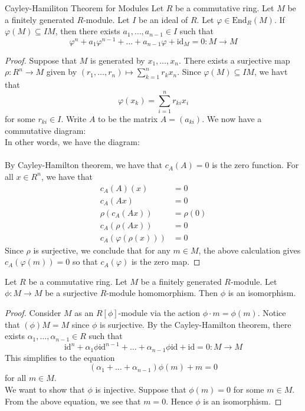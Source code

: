 \documentclass[a4paper]{article}
\begin{document}
\begin{thm}{Cayley-Hamiliton Theorem for Modules}{} Let $R$ be a commutative ring. Let $M$ be a finitely generated $R$-module. Let $I$ be an ideal of $R$. Let $\varphi\in\text{End}_R(M)$. If $\varphi(M)\subseteq IM$, then there exists $a_1,\dots,a_{n-1}\in I$ such that $$\varphi^n+a_1\varphi^{n-1}+\dots+a_{n-1}\varphi+\text{id}_M=0:M\to M$$ 
\begin{proof}
Suppose that $M$ is generated by $x_1,\dots,x_n$. There exists a surjective map $\rho:R^n\to M$ given by $(r_1,\dots,r_n)\mapsto\sum_{k=1}^nr_kx_n$. Since $\varphi(M)\subseteq IM$, we havt that $$\varphi(x_k)=\sum_{i=1}^nr_{ki}x_i$$ for some $r_{ki}\in I$. Write $A$ to be the matrix $A=(a_{ki})$. We now have a commutative diagram: \\
In other words, we have the diagram: \\
\\
By Cayley-Hamilton theorem, we have that $c_A(A)=0$ is the zero function. For all $x\in R^n$, we have that 
\begin{align*}
c_A(A)(x)&=0\\
c_A(Ax)&=0\\
\rho(c_A(Ax))&=\rho(0)\\
c_A(\rho(Ax))&=0\tag{$\rho$ is $R$-linear}\\
c_A(\varphi(\rho(x)))&=0\tag{Diagram is commutative}
\end{align*}
Since $\rho$ is surjective, we conclude that for any $m\in M$, the above calculation gives $c_A(\varphi(m))=0$ so that $c_A(\varphi)$ is the zero map. 
\end{proof}
\end{thm}

\begin{prp}{}{} Let $R$ be a commutative ring. Let $M$ be a finitely generated $R$-module. Let $\phi:M\to M$ be a surjective $R$-module homomorphism. Then $\phi$ is an isomorphism. 
\begin{proof}
Consider $M$ as an $R[\phi]$-module via the action $\phi\cdot m=\phi(m)$. Notice that $(\phi)M=M$ since $\phi$ is surjective. By the Cayley-Hamilton theorem, there exists $\alpha_1,\dots,\alpha_{n-1}\in R$ such that $$\text{id}^n+\alpha_1\phi\text{id}^{n-1}+\dots+\alpha_{n-1}\phi\text{id}+\text{id}=0:M\to M$$ This simplifies to the equation $$(\alpha_1+\dots+\alpha_{n-1})\phi(m)+m=0$$ for all $m\in M$. \\

We want to show that $\phi$ is injective. Suppose that $\phi(m)=0$ for some $m\in M$. From the above equation, we see that $m=0$. Hence $\phi$ is an isomorphism. 
\end{proof}
\end{prp}
\end{document}
